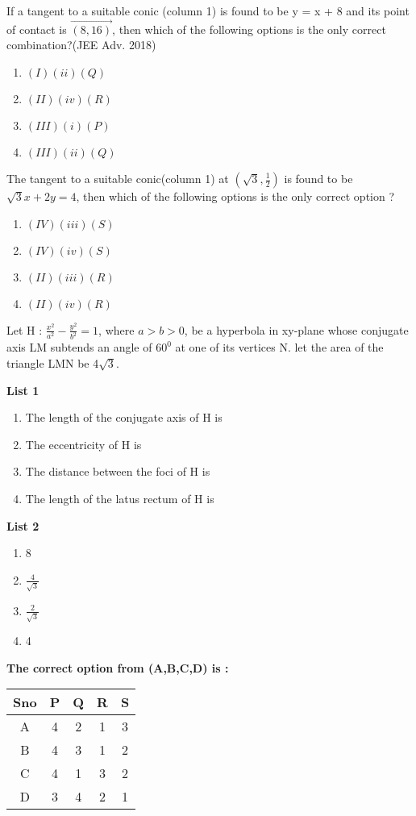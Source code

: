 \item If a tangent to a suitable conic (column 1) is found to be y = x + 8 and its point of contact is $\vec{(8, 16)}$, then which of the following
options is the only correct combination?\hfill {(JEE Adv. 2018)}

\begin{enumerate}[label=(\alph*)]
    \item $(I)(ii)(Q)$
    \item $(II)(iv)(R)$
    \item $(III)(i)(P)$
    \item $(III)(ii)(Q)$
\end{enumerate}

\item  The tangent to a suitable conic(column 1) at $(\sqrt{3},\frac{1}{2})$ is found to be $\sqrt{3}x + 2y = 4$, then which of the following options is the only correct option ? 

\begin{enumerate}[label=(\alph*)]
    \item $(IV)(iii)(S)$
    \item $(IV)(iv)(S)$
    \item $(II)(iii)(R)$
    \item $(II)(iv)(R)$
\end{enumerate}

 \item Let H : $\frac{x^2}{a^2}-\frac{y^2}{b^2}= 1$, where $a>b>0$, be a hyperbola in xy-plane whose conjugate axis LM subtends an angle of $60^0$ at one of its vertices N. let the area of the triangle LMN be 4$\sqrt{3}$.

\begin{multicols}{2}
\textbf{List 1}
\begin{enumerate}
    \item The length of the conjugate axis of H is
    \item The eccentricity of H is
    \item The distance between the foci of H is
    \item The length of the latus rectum of H is
\end{enumerate}
\columnbreak


\textbf{List 2}
\begin{enumerate}
    \item 8
    \item $\frac{4}{\sqrt{3}}$
    \item $\frac{2}{\sqrt{3}}$
    \item 4

\end{enumerate}
\end{multicols}
\textbf{The correct option from (A,B,C,D) is :}

\begin{table}[h]
\centering

\begin{tabular}{|c|c|c|c|c|}
\hline
Sno & P & Q & R & S \\ \hline
A & 4 & 2 & 1 & 3 \\ \hline
B & 4 & 3 & 1 & 2 \\ \hline
C & 4 & 1 & 3 & 2 \\ \hline
D & 3 & 4 & 2 & 1 \\ \hline
\end{tabular}
\end{table}


